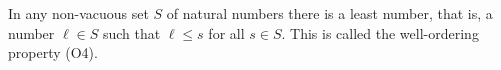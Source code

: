 In any non-vacuous set $S$ of natural numbers there is a least number, that is, a number $\ell \in S$ such that $\ell \leq s$ for all $s \in S$. This is called the well-ordering property (O4).
